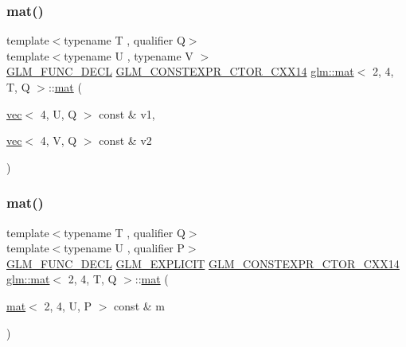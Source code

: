 \mbox{\label{structglm_1_1mat_3_012_00_014_00_01_t_00_01_q_01_4_aa3fa882e6b26c7fc035f8c17e17ff721}} 
\subsubsection{\texorpdfstring{mat()}{mat()}\hspace{0.1cm}{\footnotesize\ttfamily [8/21]}}
{\footnotesize\ttfamily template$<$typename T , qualifier Q$>$ \\
template$<$typename U , typename V $>$ \\
\mbox{\hyperlink{setup_8hpp_ab2d052de21a70539923e9bcbf6e83a51}{G\+L\+M\+\_\+\+F\+U\+N\+C\+\_\+\+D\+E\+CL}} \mbox{\hyperlink{setup_8hpp_a0900f9145e68bf6061b6f5e7be3fa751}{G\+L\+M\+\_\+\+C\+O\+N\+S\+T\+E\+X\+P\+R\+\_\+\+C\+T\+O\+R\+\_\+\+C\+X\+X14}} \mbox{\hyperlink{structglm_1_1mat}{glm\+::mat}}$<$ 2, 4, T, Q $>$\+::\mbox{\hyperlink{structglm_1_1mat}{mat}} (\begin{DoxyParamCaption}\item[{\mbox{\hyperlink{structglm_1_1vec}{vec}}$<$ 4, U, Q $>$ const \&}]{v1,  }\item[{\mbox{\hyperlink{structglm_1_1vec}{vec}}$<$ 4, V, Q $>$ const \&}]{v2 }\end{DoxyParamCaption})}

\mbox{\label{structglm_1_1mat_3_012_00_014_00_01_t_00_01_q_01_4_a9f8b14350b606e58d0bf69a7cd35bf45}} 
\subsubsection{\texorpdfstring{mat()}{mat()}\hspace{0.1cm}{\footnotesize\ttfamily [9/21]}}
{\footnotesize\ttfamily template$<$typename T , qualifier Q$>$ \\
template$<$typename U , qualifier P$>$ \\
\mbox{\hyperlink{setup_8hpp_ab2d052de21a70539923e9bcbf6e83a51}{G\+L\+M\+\_\+\+F\+U\+N\+C\+\_\+\+D\+E\+CL}} \mbox{\hyperlink{setup_8hpp_a6c74f5a5e7b134ab69023ff9a30d4d5d}{G\+L\+M\+\_\+\+E\+X\+P\+L\+I\+C\+IT}} \mbox{\hyperlink{setup_8hpp_a0900f9145e68bf6061b6f5e7be3fa751}{G\+L\+M\+\_\+\+C\+O\+N\+S\+T\+E\+X\+P\+R\+\_\+\+C\+T\+O\+R\+\_\+\+C\+X\+X14}} \mbox{\hyperlink{structglm_1_1mat}{glm\+::mat}}$<$ 2, 4, T, Q $>$\+::\mbox{\hyperlink{structglm_1_1mat}{mat}} (\begin{DoxyParamCaption}\item[{\mbox{\hyperlink{structglm_1_1mat}{mat}}$<$ 2, 4, U, P $>$ const \&}]{m }\end{DoxyParamCaption})}

